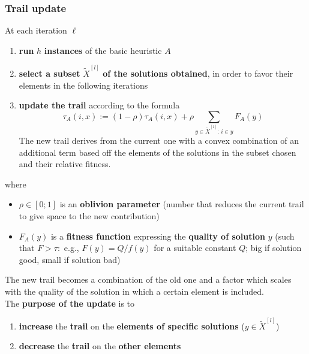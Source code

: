 \documentclass[11pt]{article}
\begin{document}
	\subsubsection{Trail update}
	At each iteration $\ell$
	\begin{enumerate}
		\item \textbf{run} $h$ \textbf{instances} of the basic heuristic $A$
		
		\item \textbf{select a subset} $\tilde{X}^{[l]}$ \textbf{of the solutions obtained}, in order to favor their elements in the following iterations
		
		\item \textbf{update the trail} according to the formula
		$$ \tau_A (i,x) := (1 - \rho) \tau_A (i,x) + \rho \sum_{y \in \tilde{X}^{[l]}: \, i \in y} F_A (y) $$
		The new trail derives from the current one with a convex combination of an additional term based off the elements of the solutions in the subset chosen and their relative fitness.
	\end{enumerate}
	
	where
	\begin{itemize}
		\item $\rho \in [0; 1]$ is an \textbf{oblivion parameter} (number that reduces the current trail to give space to the new contribution)
		
		\item $F_A (y)$ is a \textbf{fitness function} expressing the \textbf{quality of solution} $y$ (such that $F > \tau :$ e.g., $F (y ) = Q/f (y )$ for a suitable constant $Q$; big if solution good, small if solution bad)
	\end{itemize}
	
	The new trail becomes a combination of the old one and a factor which scales with the quality of the solution in which a certain element is included.\\
	
	The \textbf{purpose of the update} is to
	\begin{enumerate}
		\item \textbf{increase} the \textbf{trail} on the \textbf{elements of specific solutions} ($y ∈ \tilde{X}^{[l]}$)
		
		\item \textbf{decrease} the \textbf{trail} on the \textbf{other elements}
	\end{enumerate}

	\newpage
\end{document}
